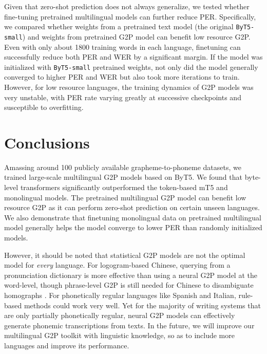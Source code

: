 \documentclass[a4paper]{article}
\begin{document}
Given that zero-shot prediction does not always generalize, we tested whether fine-tuning pretrained multilingual models can further reduce PER. Specifically, we compared whether weights from a pretrained text model (the original \texttt{ByT5-small}) and weights from pretrained G2P model can benefit low resource G2P. Even with only about 1800 training words in each language, finetuning can successfully reduce both PER and WER by a significant margin.
If the model was initialized with \texttt{ByT5-small} pretrained weights, not only did the model generally converged to higher PER and WER but also took more iterations to train. However, for low resource languages, the training dynamics of G2P models was very unstable, with PER rate varying greatly at successive checkpoints and susceptible to overfitting.

\section{Conclusions}
Amassing around 100 publicly available grapheme-to-phoneme datasets, we trained large-scale multilingual G2P models based on ByT5.  We found that byte-level transformers significantly outperformed the token-based mT5 and monolingual models. The pretrained multilingual G2P model can benefit low resource G2P as it can perform zero-shot prediction on certain unseen languages. We also demonstrate that finetuning monolingual data on pretrained multilingual model generally helps the model converge to lower PER than randomly initialized models. 


However, it should be noted that statistical G2P models are not the optimal model for \textit{every} language. For logogram-based Chinese, querying from a pronunciation dictionary is more effective than using a neural G2P model at the word-level, though phrase-level G2P is still needed for Chinese to disambiguate homographs \cite{Park2020}. For phonetically regular languages like Spanish and Italian, rule-based methods could work very well. Yet for the majority of writing systems that are only partially phonetically regular, neural G2P models can effectively generate phonemic transcriptions from texts. In the future, we will improve our multilingual G2P toolkit with linguistic knowledge, so as to include more languages and improve its performance.

\newpage



\end{document}

